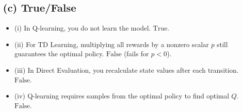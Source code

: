 \documentclass[11pt]{article}
\begin{document}
\subsection{(c) True/False}
\begin{itemize}
\item (i) In Q-learning, you do not learn the model. $\boxed{\text{True}}$.
\item (ii) For TD Learning, multiplying all rewards by a nonzero scalar $p$ still guarantees the optimal policy. $\boxed{\text{False}}$ (fails for $p<0$).
\item (iii) In Direct Evaluation, you recalculate state values after each transition. $\boxed{\text{False}}$.
\item (iv) Q-learning requires samples from the optimal policy to find optimal $Q$. $\boxed{\text{False}}$.
\end{itemize}
\end{document}
